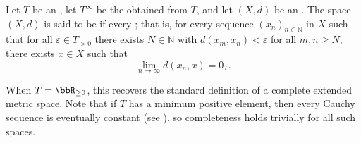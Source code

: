 \begin{definition} \label{definition:complete_extended_metric_space}
    Let $T$ be an , let $T^\infty$ be the  obtained from $T$, and let $(X, d)$ be an .
    The space $(X, d)$ is said to be  if every  ; that is,
    for every sequence $(x_n)_{n \in \mathbb{N}}$ in $X$ such that for all $\varepsilon \in T_{>0}$ there exists $N \in \mathbb{N}$ with $d(x_m, x_n) < \varepsilon$ for all $m, n \geq N$, there exists $x \in X$ such that
    $$\lim_{n \to \infty} d(x_n, x) = 0_T.$$

    When $T = \bbR_{\geq 0}$, this recovers the standard definition of a complete extended metric space. Note that if $T$ has a minimum positive element, then every Cauchy sequence is eventually constant (see ), so completeness holds trivially for all such spaces.
\end{definition}

